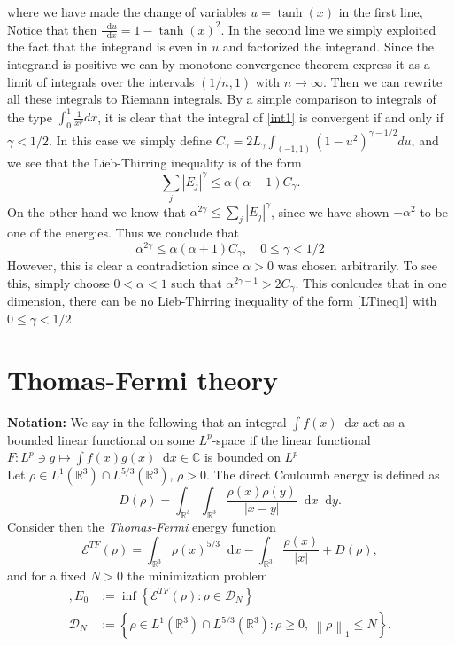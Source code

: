 \documentclass[a4paper,11pt]{article}
\newcommand{\norm}[1]{\left\lVert #1 \right\rVert}
\newcommand{\abs}[1]{\left\lvert #1 \right\rvert}
\newcommand*\diff{\mathop{}\!\mathrm{d}}
\newcommand{\R}{\mathbb{R}}
\newcommand{\C}{\mathbb{C}}
\numberwithin{equation}{section}
\begin{document}
where we have made the change of variables $ u=\tanh(x) $ in the first line, Notice that then $ \frac{\diff u}{\diff x}=1-\tanh(x)^2 $. In the second line we simply exploited the fact that the integrand is even in $ u $ and factorized the integrand. Since the integrand is positive we can by monotone convergence theorem express it as a limit of integrals over the intervals $ (1/n,1) $ with $ n\to \infty $. Then we can rewrite all these integrals to Riemann integrals. By a simple comparison to integrals of the type $ \int_{0}^{1}\frac{1}{x^p}dx $, it is clear that the integral of \eqref{int1} is convergent if and only if $ \gamma<1/2 $. In this case we simply define $ C_\gamma=2L_\gamma\int_{(-1,1)}(1-u^2)^{\gamma-1/2} du $, and we see that the Lieb-Thirring inequality is of the form\begin{equation}
\sum_j\abs{E_j}^\gamma\leq\alpha(\alpha+1)C_\gamma.
\end{equation}
On the other hand we know that $ \alpha^{2\gamma}\leq\sum_j\abs{E_j}^\gamma $, since we have shown $ -\alpha^2 $ to be one of the energies. Thus we conclude that \begin{equation}
\alpha^{2\gamma}\leq\alpha(\alpha+1)C_\gamma,\quad 0\leq \gamma<1/2
\end{equation}
However, this is clear a contradiction since $ \alpha>0 $ was chosen arbitrarily. To see this, simply choose $ 0<\alpha<1 $ such that  $ \alpha^{2\gamma-1}> 2C_\gamma $. This conlcudes that in one dimension, there can be no Lieb-Thirring inequality of the form \eqref{LTineq1} with $ 0\leq\gamma<1/2 $.
\section{Thomas-Fermi theory}
\textbf{Notation:} We say in the following that an integral $ \int f(x)\diff x $ act as a bounded linear functional on some $ L^p $-space if the linear functional $ F:L^p\ni g\mapsto\int f(x)g(x) \diff x\in\C$ is bounded on $ L^p $\vspace{0.5cm}\\
Let $ \rho\in L^1(\R^3)\cap L^{5/3}(\R^3) $, $ \rho>0 $. The direct Couloumb energy is defined as \begin{equation}
D(\rho)=\int_{\R^3}\int_{\R^3}\frac{\rho(x)\rho(y)}{\abs{x-y}}\diff x\diff y. 
\end{equation}
Consider then the \emph{Thomas-Fermi} energy function \begin{equation}
\mathcal{E}^{TF}(\rho)=\int_{\R^3}\rho(x)^{5/3} \diff x -\int_{\R^3}\frac{\rho(x)}{\abs{x}}+D(\rho),
\end{equation} 
and for a fixed $ N>0 $ the minimization problem \begin{equation}
\begin{aligned},
E_0&:=\inf\left\{\mathcal{E}^{TF}(\rho) : \rho\in\mathcal{D}_N \right\}\\
\mathcal{D}_N&:=\left\{\rho\in L^1(\R^3)\cap L^{5/3}(\R^3) : \rho\geq0,\ \norm{\rho}_1\leq N \right\}.
\end{aligned}
\end{equation}
\end{document}
